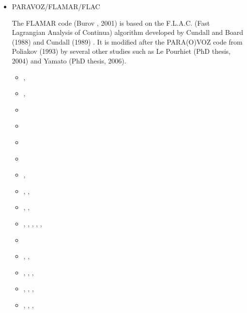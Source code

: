 \begin{itemize}
\item PARAVOZ/FLAMAR/FLAC 

The FLAMAR code (Burov \etal, 2001) is based on the
F.L.A.C. (Fast Lagrangian Analysis of Continua) algorithm developed by Cundall and Board (1988) 
and Cundall (1989) \cite{cund89}. It is modified after the PARA(O)VOZ code from 
Poliakov \etal (1993) \cite{pocp93} by several
other studies such as Le Pourhiet (PhD thesis, 2004) and Yamato (PhD thesis, 2006).

\begin{scriptsize}
\begin{itemize}
\item[\nineteeneightynine]   \textcite{cund89},  \textcite{hoor89}
\item[\nineteenninetythree]  \textcite{pocp93},  \textcite{zhhj93}
\item[\nineteenninetyfour]   \textcite{wizh94}
\item[\nineteenninetysix]    \textcite{zhho96}
\item[\nineteenninetyeight]  \textcite{gepd98}
\item[\twothousand]          \textcite{labp00}
\item[\twothousandone]       \textcite{bujl01},  \textcite{bupo01}
\item[\twothousandtwo]       \textcite{bast02},  \textcite{clbb02},  \textcite{kozc02}
\item[\twothousandthree]     \textcite{hags03},  \textcite{gehd03},  \textcite{upke03}
\item[\twothousandfour]      \textcite{guhl04},  \textcite{gewi04},  
                             \textcite{toba04},  \textcite{tibb04},
                             \textcite{clbm04},  \textcite{tobj04}
\item[\twothousandfive]      \textcite{bugu05}
\item[\twothousandsix]       \textcite{buwa06},  \textcite{lemm06}, \textcite{legs06}
\item[\twothousandseven]     \textcite{nabu07},  \textcite{yaab07}, 
                             \textcite{buto07},  \textcite{chem07}
\item[\twothousandeight]     \textcite{yaba08},  \textcite{tibb08}, 
                             \textcite{buya08},  \textcite{gogm08}
\item[\twothousandnine]      \textcite{gecm09},  \textcite{yahb09}, \textcite{bucl09},  

\end{itemize}
\end{scriptsize}
\end{itemize}
